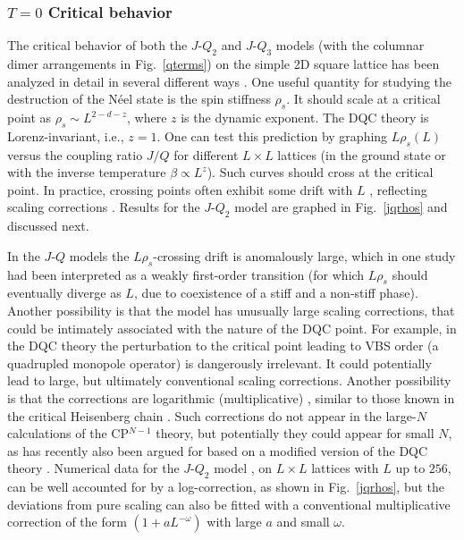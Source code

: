\documentclass[10pt,pre,aps,twocolumn,showpacs,superscriptaddress,floatfix]{revtex4-1}
\begin{document}
\subsubsection{$T=0$ Critical behavior}

The critical behavior of both the $J$-$Q_2$ and $J$-$Q_3$ models (with the columnar dimer arrangements in Fig.~\ref{qterms}) on the simple 2D square 
lattice has been analyzed in detail in several different ways \cite{Sandvik07,Jiang08,kaul2008:jqlgN,melko2008:jq,lou2009:sun,Sandvik10c}. One useful quantity 
for studying the destruction of the N\'eel state is the spin stiffness $\rho_s$. It should scale at a critical point as $\rho_s \sim L^{2-d-z}$, 
where $z$ is the dynamic exponent. The DQC theory is Lorenz-invariant, i.e., $z=1$. One can test this prediction by graphing 
$L\rho_s(L)$ versus the coupling ratio $J/Q$ for different $L\times L$ lattices (in the ground state or with the inverse temperature $\beta \propto L^z$). 
Such curves should cross at the critical point. In practice, crossing points often exhibit some drift with $L$ \cite{melko2008:jq}, reflecting scaling 
corrections \cite{Sandvik10c}. Results for the $J$-$Q_2$ model are graphed in Fig.~\ref{jqrhos} and discussed next.

In the $J$-$Q$ models the $L\rho_s$-crossing drift is anomalously large, which in one study \cite{Jiang08} had been interpreted as a weakly first-order transition (for which 
$L\rho_s$ should eventually diverge as $L$, due to coexistence of a stiff and a non-stiff phase). Another possibility is that the model has unusually
large scaling corrections, that could be intimately associated with the nature of the DQC point. For example, in the DQC theory the perturbation to the 
critical point leading to VBS order (a quadrupled monopole operator) is dangerously irrelevant. It could potentially lead to large, but ultimately conventional
scaling corrections. Another possibility is that the corrections are logarithmic (multiplicative) \cite{Sandvik10c,banerjee2010:log}, similar to those known 
in the critical Heisenberg chain \cite{Giamarchi89}. Such corrections do not appear in the large-$N$ calculations of the CP$^{N-1}$ theory, but potentially they could 
appear for small $N$, as has recently also been argued for based on a modified version of the DQC theory \cite{Nogueira11}. Numerical data for the $J$-$Q_2$ 
model \cite{Sandvik10c}, on $L\times L$ lattices with $L$ up to $256$, can be well accounted for by a log-correction, as shown in Fig.~\ref{jqrhos}, but the 
deviations from pure scaling can also be fitted with a conventional multiplicative correction of the form $(1+aL^{-\omega})$ with large $a$ and small $\omega$.
\end{document}
